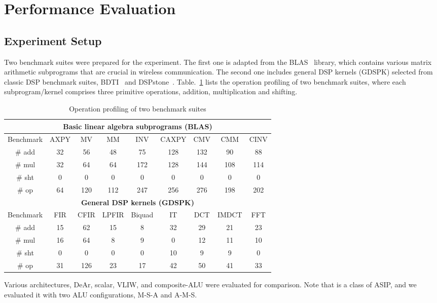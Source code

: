 \section{Performance Evaluation}
\subsection{Experiment Setup}
\label{sec:evaluation:setup}
Two benchmark suites were prepared for the experiment.
The first one is adapted from the BLAS~\cite{blas} library, 
which contains various matrix arithmetic subprograms that are crucial in wireless communication.
The second one includes general DSP kernels (GDSPK) selected from classic DSP benchmark suites, BDTI~\cite{bdti} and DSPstone~\cite{dspstone}.
Table.~\ref{tab:op} lists the operation profiling of two benchmark suites, 
where each subprogram/kernel comprises three primitive operations, addition, multiplication and shifting.
\setlength{\textfloatsep}{0pt}
\begin{table}[h]%
\centering%
\caption{Operation profiling of two benchmark suites}%
\label{tab:op}%
\resizebox{\columnwidth}{!}%
{%
\begin{tabular}{|c|c|c|c|c|c|c|c|c|}%
\hline%
\multicolumn{9}{|c|}{\textbf{Basic linear algebra subprograms (BLAS)}} \\ \hline%
Benchmark              & AXPY   & MV     & MM      & INV      & CAXPY  & CMV  & CMM    & CINV  \\ \hline
\# add            &  32    &  56    &   48    &    75    &  128   & 132  &   90   &  88   \\ \hline
\# mul            &  32    &  64    &   64    &   172    &  128   & 144  &  108   & 114   \\ \hline
\# sht            &   0    &   0    &    0    &     0    &    0   &   0  &    0   &   0   \\ \hline
\# op             &  64    & 120    &  112    &   247    &  256   & 276  &  198   & 202   \\ \hline
\multicolumn{9}{|c|}{\textbf{General DSP kernels (GDSPK)}}                     \\ \hline
Benchmark              & FIR    & CFIR   & LPFIR   & Biquad   & IT     & DCT  & IMDCT  & FFT   \\ \hline
\# add            & 15     &  62    &   15    &    8     &  32    &  29  &   21   &  23   \\ \hline
\# mul            & 16     &  64    &    8    &    9     &   0    &  12  &   11   &  10   \\ \hline
\# sht            &  0     &   0    &    0    &    0     &  10    &   9  &    9   &   0   \\ \hline
\# op             & 31     & 126    &   23    &   17     &  42    &  50  &   41   &  33   \\ \hline
\end{tabular}%
}%
\end{table}%
Various architectures, DeAr, scalar, VLIW, and composite-ALU \cite{cascade} were evaluated for comparison. 
Note that \cite{cascade} is a class of ASIP, and we evaluated it with two ALU configurations, M-S-A and A-M-S.

